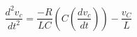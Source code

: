 \documentclass[preview]{standalone}
\begin{document}
\begin{center}
\[\frac{d^2v_c}{dt^2} = \frac{-R}{LC} \left(C \left(\frac{dv_c}{dt}\right) \right) - \frac{v_C}{L}\]
\end{center}
\end{document}

